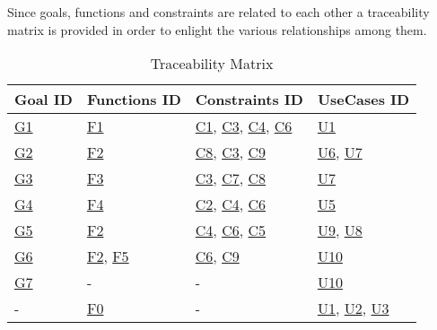 Since goals, functions and constraints are related to each other a traceability matrix is provided in order to enlight the various relationships among them.
\begin{flushleft}

\begin{table}[htp]
\centering
\begin{tabular}{|l|l|l|l|}
\hline
Goal ID&Functions ID&Constraints ID&UseCases ID\\
\hline
\hyperlink{G1}{G1}&\hyperlink{sec:f1}{F1}&\hyperlink{C1}{C1}, \hyperlink{C3}{C3}, \hyperlink{C4}{C4}, \hyperlink{C6}{C6}&\hyperlink{tab:reportcreationtab}{U1}\\
\hline
\hyperlink{G2}{G2}&\hyperlink{sec:f2}{F2}&\hyperlink{C8}{C8}, \hyperlink{C3}{C3}, \hyperlink{C9}{C9}&\hyperlink{tab:dataminingtab}{U6}, \hyperlink{tab:dataminingofficertab}{U7}\\
\hline
\hyperlink{G3}{G3}&\hyperlink{sec:f3}{F3}&\hyperlink{C3}{C3}, \hyperlink{C7}{C7}, \hyperlink{C8}{C8}&\hyperlink{tab:dataminingofficertab}{U7}\\
\hline
\hyperlink{G4}{G4}&\hyperlink{sec:f4}{F4}&\hyperlink{C2}{C2}, \hyperlink{C4}{C4}, \hyperlink{C6}{C6}&\hyperlink{tab:AutomaticTrafficTicket}{U5}\\
\hline
\hyperlink{G5}{G5}&\hyperlink{sec:f2}{F2}&\hyperlink{C4}{C4}, \hyperlink{C6}{C6}, \hyperlink{C5}{C5}&\hyperlink{tab:dataminingvehicleofficerstab}{U9}, \hyperlink{tab:dataminingvehicletab}{U8}\\
\hline
\hyperlink{G6}{G6}&\hyperlink{sec:f2}{F2}, \hyperlink{sec:f5}{F5}&\hyperlink{C6}{C6}, \hyperlink{C9}{C9}&\hyperlink{tab:statisticsconsultingtab}{U10}\\
\hline
\hyperlink{G7}{G7}&-&-&\hyperlink{tab:statisticsconsultingtab}{U10}\\
\hline
-&\hyperlink{sec:f0}{F0}&-&\hyperlink{tab:signupusecase}{U1}, \hyperlink{tab:loginusecase}{U2}, \hyperlink{tab:recoverpasswordusecase}{U3}\\
\hline
\end{tabular}

\caption{Traceability Matrix} 

\end{table}

\end{flushleft}